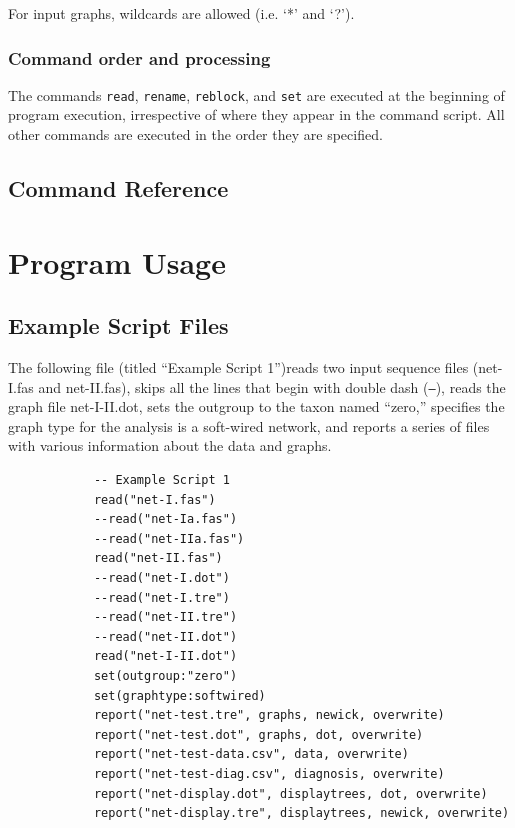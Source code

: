 \documentclass[11pt]{book}
\begin{document}
{{		For input graphs, wildcards are allowed (i.e. `*' and `?').\\
	
	
	\subsection{Command order and processing}
		The commands \texttt{read}, \texttt{rename}, \texttt{reblock}, and \texttt{set} are executed at
		the beginning of program execution, irrespective of where they appear in the command script. 
		All other commands are executed in the order they are specified.


\section{Command Reference}
	

\chapter{Program Usage}
\section{Example Script Files}
	The following file (titled ``Example Script 1'')reads two input sequence files (net-I.fas and net-II.fas), 
	skips all 	the lines that begin with double dash (\texttt{--}), reads the graph file net-I-II.dot, sets the 
	outgroup to the taxon named ``zero,'' specifies the graph type for the analysis is a soft-wired network, 
	and 	reports a series of files with various information about the data and graphs.
	
		\begin{verbatim}
			-- Example Script 1
			read("net-I.fas")
			--read("net-Ia.fas")
			--read("net-IIa.fas")
			read("net-II.fas")
			--read("net-I.dot")
			--read("net-I.tre")
			--read("net-II.tre")
			--read("net-II.dot")
			read("net-I-II.dot")
			set(outgroup:"zero")
			set(graphtype:softwired)
			report("net-test.tre", graphs, newick, overwrite)
			report("net-test.dot", graphs, dot, overwrite)
			report("net-test-data.csv", data, overwrite)
			report("net-test-diag.csv", diagnosis, overwrite)
			report("net-display.dot", displaytrees, dot, overwrite)
			report("net-display.tre", displaytrees, newick, overwrite)
		\end{verbatim}
	
}}
\end{document}
